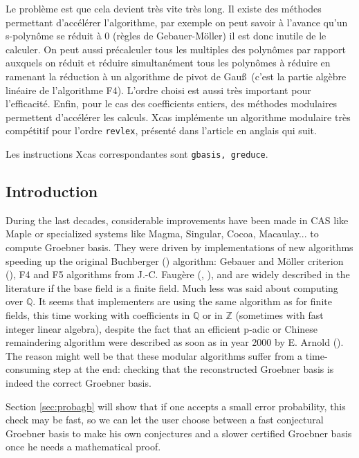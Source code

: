 \documentclass[a4paper,11pt]{article}
\begin{document}
\begin{giacjshere}
Le problème est que cela devient très vite très long. Il existe
des méthodes permettant d'accélérer l'algorithme, par exemple
on peut savoir à l'avance qu'un s-polynôme se réduit à 0
(règles de Gebauer-Möller) il est donc inutile de le calculer.
On peut aussi précalculer tous les multiples des polynômes
par rapport auxquels on réduit et réduire simultanément
tous les polynômes à réduire en ramenant la réduction
à un algorithme de pivot de Gau\ss\ (c'est la partie
algèbre linéaire de l'algorithme F4). L'ordre choisi
est aussi très important pour l'efficacité. Enfin, pour le cas des
coefficients entiers, des méthodes modulaires permettent
d'accélérer les calculs. Xcas implémente un algorithme modulaire
très compétitif pour l'ordre {\tt revlex}, présenté
dans l'article en anglais qui suit.

Les instructions Xcas correspondantes sont {\tt gbasis, greduce}.



\subsection{Introduction}
During the last decades, considerable improvements have been made 
in CAS like Maple or specialized systems like Magma, Singular, 
Cocoa, Macaulay... to compute Groebner basis. 
They were driven by
implementations of new algorithms speeding up the original Buchberger 
(\cite{buchberger1985grobner})
algorithm: Gebauer and M\"oller criterion (\cite{Gebauer1988275}), F4 and F5
algorithms from J.-C. Faug\`ere (\cite{F99a}, \cite{Fau02a}), and are widely described in the
literature if the base field is a finite field.
Much less was said about computing over $\mathbb{Q}$. It seems that
implementers are using the same algorithm as for finite fields,
this time working with coefficients in $\mathbb{Q}$ or in $\mathbb{Z}$ (sometimes
with fast integer linear algebra), 
despite the fact that an efficient p-adic or Chinese remaindering
algorithm were described as soon as in year 2000 by E. Arnold
(\cite{Arnold2003403}). 
The reason might well be that these modular algorithms suffer from a
time-consuming step at the end: checking that the reconstructed
Groebner basis is indeed the correct Groebner basis.

Section \ref{sec:probagb}
will show that if one accepts a small error probability, this check 
may be fast, so we can let the user choose between a fast conjectural
Groebner basis to make his own conjectures and a slower certified
Groebner basis once he needs a mathematical proof.


\end{giacjshere}
\end{document}
